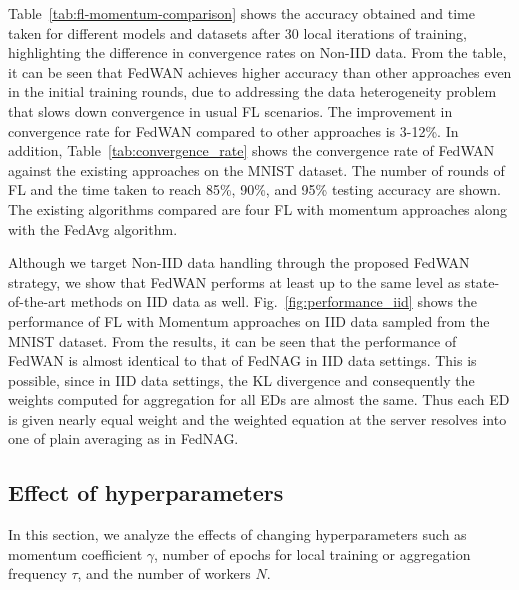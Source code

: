 \documentclass[journal]{IEEEtran}
\begin{document}
Table~\ref{tab:fl-momentum-comparison} shows the accuracy obtained and time taken for different models and datasets after 30 local iterations of training, highlighting the difference in convergence rates on Non-IID data. From the table, it can be seen that FedWAN achieves higher accuracy than other approaches even in the initial training rounds, due to addressing the data heterogeneity problem that slows down convergence in usual FL scenarios. The improvement in convergence rate for FedWAN compared to other approaches is 3-12\%. In addition, Table~\ref{tab:convergence_rate} shows the convergence rate of FedWAN against the existing approaches on the MNIST dataset. The number of rounds of FL and the time taken to reach 85\%, 90\%, and 95\% testing accuracy are shown. The existing algorithms compared are four FL with momentum approaches along with the FedAvg algorithm.


Although we target Non-IID data handling through the proposed FedWAN strategy, we show that FedWAN performs at least up to the same level as state-of-the-art methods on IID data as well. Fig.~\ref{fig:performance_iid} shows the performance of FL with Momentum approaches on IID data sampled from the MNIST dataset. From the results, it can be seen that the performance of FedWAN is almost identical to that of FedNAG in IID data settings. This is possible, since in IID data settings, the KL divergence and consequently the weights computed for aggregation for all EDs are almost the same. Thus each ED is given nearly equal weight and the weighted equation at the server resolves into one of plain averaging as in FedNAG. 

\subsection{Effect of hyperparameters}
In this section, we analyze the effects of changing hyperparameters such as momentum coefficient $\gamma$, number of epochs for local training or aggregation frequency $\tau$, and the number of workers $N$.
\end{document}
